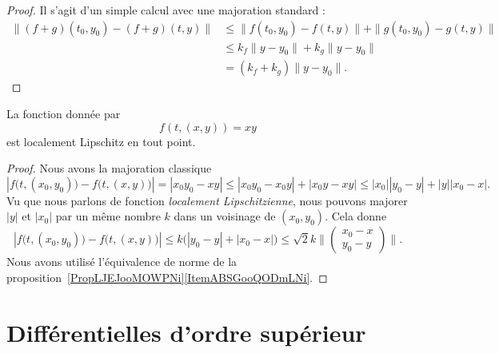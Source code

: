 \begin{proof}
	Il s'agit d'un simple calcul avec une majoration standard :
	\begin{subequations}
		\begin{align}
			\| (f+g)(t_0,y_0)-(f+g)(t,y) \| & \leq \|  f(t_0,y_0)-f(t,y)  \|+\| g(t_0,y_0)-g(t,y) \| \\
			                                & \leq k_f\| y-y_0 \|+k_g\| y-y_0 \|                     \\
			                                & =(k_f+k_g)\| y-y_0 \|.
		\end{align}
	\end{subequations}
\end{proof}

\begin{lemma}   \label{LemCFZUooVqZmpc}
	La fonction donnée par
	\begin{equation}
		f(t, (x,y) )=xy
	\end{equation}
	est localement Lipschitz en tout point.
\end{lemma}

\begin{proof}
	Nous avons la majoration classique
	\begin{equation}
		| f\big(t,(x_0,y_0)\big)-f\big( t,(x,y) \big) |=| x_0y_0-xy |\leq| x_0y_0-x_0y |+| x_0y-xy |\leq | x_0 || y_0-y |+| y || x_0-x |.
	\end{equation}
	Vu que nous parlons de fonction \emph{localement Lipschitzienne}, nous pouvons majorer \( | y |\) et \( | x_0 |\) par un même nombre \( k\) dans un voisinage de \( (x_0,y_0)\). Cela donne
	\begin{equation}
		| f\big(t,(x_0,y_0)\big)-f\big( t,(x,y) \big) |\leq k\big( | y_0-y |+| x_0-x | \big)\leq \sqrt{2}k\| \begin{pmatrix}
			x_0-x \\
			y_0-y
		\end{pmatrix}\|.
	\end{equation}
	Nous avons utilisé l'équivalence de norme de la proposition~\ref{PropLJEJooMOWPNi}\ref{ItemABSGooQODmLNi}.
\end{proof}

\section{Différentielles d'ordre supérieur}		\label{SecDiffOrdSup}

